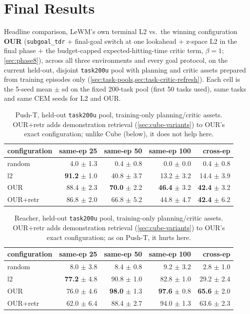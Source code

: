 \documentclass[11pt]{article}
\begin{document}
\section{Final Results}
\label{sec:final-results}
Headline comparison, LeWM's own terminal L2 vs.\ the winning configuration
\textbf{OUR} (\texttt{subgoal\_tdr} $+$ final-goal switch at one lookahead $+$ z-space L2 in
the final phase $+$ the budget-capped expected-hitting-time critic term, $\beta=1$;
\cref{sec:phase8}), across all three environments and every goal protocol, on the current
held-out, disjoint \texttt{task200u} pool with planning and critic assets prepared from
training episodes only (\cref{sec:task-pools,sec:task-critic-refresh}). Each cell is the
5-seed mean $\pm$ sd on the fixed 200-task pool (first 50 tasks used), same tasks and same
CEM seeds for L2 and OUR.

\begin{table}[H]
\centering\small
\caption{Push-T, held-out \texttt{task200u} pool, training-only planning/critic assets.
OUR+retr adds demonstration retrieval (\cref{sec:cube-variants}) to OUR's exact
configuration; unlike Cube (below), it does not help here.}
\label{tab:pusht-summary}
\begin{tabular}{lrrrr}
\toprule
configuration & same-ep 25 & same-ep 50 & same-ep 100 & cross-ep \\
\midrule
random & 4.0 $\pm$ 1.3 & 0.4 $\pm$ 0.8 & 0.0 $\pm$ 0.0 & 0.4 $\pm$ 0.8 \\
l2 & \textbf{91.2} $\pm$ 1.0 & 40.8 $\pm$ 3.7 & 13.2 $\pm$ 3.2 & 14.4 $\pm$ 3.9 \\
OUR & 88.4 $\pm$ 2.3 & \textbf{70.0} $\pm$ 2.2 & \textbf{46.4} $\pm$ 3.2 & \textbf{42.4} $\pm$ 3.2 \\
OUR+retr & 86.8 $\pm$ 2.0 & 66.8 $\pm$ 5.2 & 44.8 $\pm$ 4.7 & \textbf{42.4} $\pm$ 6.2 \\
\bottomrule
\end{tabular}
\end{table}

\begin{table}[H]
\centering\small
\caption{Reacher, held-out \texttt{task200u} pool, training-only planning/critic assets.
OUR+retr adds demonstration retrieval (\cref{sec:cube-variants}) to OUR's exact
configuration; as on Push-T, it hurts here.}
\begin{tabular}{lrrrr}
\toprule
configuration & same-ep 25 & same-ep 50 & same-ep 100 & cross-ep \\
\midrule
random & 8.0 $\pm$ 3.8 & 8.4 $\pm$ 0.8 & 9.2 $\pm$ 3.2 & 2.8 $\pm$ 1.0 \\
l2 & \textbf{77.2} $\pm$ 4.8 & 90.8 $\pm$ 1.0 & 82.8 $\pm$ 1.0 & 29.2 $\pm$ 2.4 \\
OUR & 76.0 $\pm$ 4.6 & \textbf{98.0} $\pm$ 1.3 & \textbf{97.6} $\pm$ 0.8 & \textbf{65.6} $\pm$ 2.0 \\
OUR+retr & 62.0 $\pm$ 6.4 & 88.4 $\pm$ 2.7 & 94.0 $\pm$ 1.3 & 63.6 $\pm$ 2.3 \\
\bottomrule
\end{tabular}
\end{table}
\end{document}
